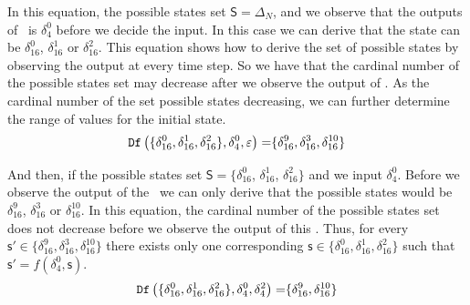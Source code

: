 \begin{example}
In this equation, the possible states set $\mathsf{S}=\Delta_N$, and  we observe that the outputs of \BCN\ is $\delta_4^0$ before we decide the input. In this case we can derive that the state can be $\delta_{16}^0$, $\delta_{16}^1$ or  $\delta_{16}^2$. This equation shows how to derive the set of possible states by observing the output at every time step. So we have that the cardinal number of the possible states set may decrease after we observe the output of \BCN. As the cardinal number of the set possible states decreasing, we can further determine the range of values for the initial state. 
\begin{equation*}
\begin{split}
{\tt Df}\left(\{\delta_{16}^0,\delta_{16}^1,\delta_{16}^2\},\delta_4^0,\varepsilon\right)=&\{\delta_{16}^{9},\delta_{16}^3,\delta_{16}^{10}\}\\
\end{split}
\label{equ:10}
\end{equation*}

And then, if the possible states set $\mathsf{S}=\{\delta_{16}^0$, $\delta_{16}^1$, $\delta_{16}^2\}$ and we input $\delta_4^0$. Before we observe the output of the \BCN\ we can only derive that the possible states would be $\delta_{16}^{9}$, $\delta_{16}^3$ or  $\delta_{16}^{10}$. In this equation, the cardinal number of the possible states set does not decrease before we observe the output of this \BCN. Thus, for every $\mathsf{s}'\in\{\delta_{16}^{9},\delta_{16}^3,\delta_{16}^{10}\}$ there exists only one corresponding $\mathsf{s}\in\{\delta_{16}^{0},\delta_{16}^1,\delta_{16}^{2}\}$ such that $\mathsf{s}'=f( \delta_4^0, \mathsf{s})$.%
\begin{equation*}
\begin{split}
{\tt Df}\left(\{\delta_{16}^0,\delta_{16}^1,\delta_{16}^2\},\delta_4^0,\delta_4^2\right)=&\{\delta_{16}^{9},\delta_{16}^{10}\}\\
\end{split}
\label{equ:11}
\end{equation*}


\end{example}
